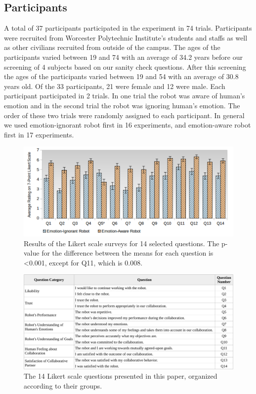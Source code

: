 \documentclass[12pt]{report}
\begin{document}
\subsection{Participants}
\label{sec:Participants}
A total of 37 participants participated in the experiment in 74 trials.
Participants were recruited from Worcester Polytechnic Institute's students and
staffs as well as other civilians recruited from outside of the campus. The ages
of the participants varied between 19 and 74 with an average of 34.2 years
before our screening of 4 subjects based on our sanity check questions. After
this screening the ages of the participants varied between 19 and 54 with an
average of 30.8 years old. Of the 33 participants, 21 were female and 12
were male. Each participant participated in 2 trials. In one trial the robot was
aware of human's emotion and in the second trial the robot was ignoring human's
emotion. The order of these two trials were randomly assigned to each
participant. In general we used emotion-ignorant robot first in 16 experiments,
and emotion-aware robot first in 17 experiments.

\begin{figure}[tbh]
\centering
\includegraphics[width=1\textwidth]{figure/14Questions.pdf}
\caption{Results of the Likert scale surveys for 14 selected questions. The
p-value for the difference between the means for each question is <0.001,
except for Q11, which is 0.008.}
\label{fig:14Questions}
\vspace*{-5mm}
\end{figure}

\begin{figure}[tbh]
\centering
\includegraphics[width=1\textwidth]{figure/table1-croped.pdf}
\caption{The 14 Likert scale questions presented in this paper, organized
according to their groups.}
\label{fig:14Questions-Table}
\end{figure}
\end{document}
